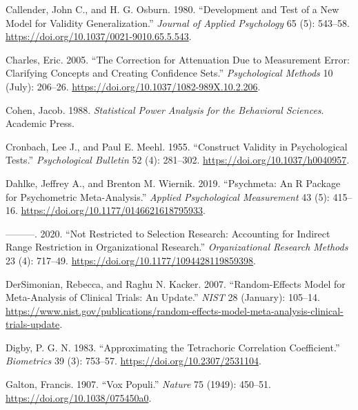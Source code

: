 \documentclass[
  letterpaper,
  DIV=11,
  numbers=noendperiod]{scrreprt}
\newlength{\cslhangindent}
\newlength{\cslentryspacingunit} %
\newenvironment{CSLReferences}[2] %
 {%
  \setlength{\parindent}{0pt}
  \ifodd #1
  \let\oldpar\par
  \def\par{\hangindent=\cslhangindent\oldpar}
  \fi
  \setlength{\parskip}{#2\cslentryspacingunit}
 }%
 {}
\begin{document}
\begin{CSLReferences}{1}{0}
\leavevmode{}%
Callender, John C., and H. G. Osburn. 1980. {``Development and Test of a
New Model for Validity Generalization.''} \emph{Journal of Applied
Psychology} 65 (5): 543--58.
\url{https://doi.org/10.1037/0021-9010.65.5.543}.

\leavevmode{}%
Charles, Eric. 2005. {``The Correction for Attenuation Due to
Measurement Error: Clarifying Concepts and Creating Confidence Sets.''}
\emph{Psychological Methods} 10 (July): 206--26.
\url{https://doi.org/10.1037/1082-989X.10.2.206}.

\leavevmode{}%
Cohen, Jacob. 1988. \emph{Statistical Power Analysis for the Behavioral
Sciences}. Academic Press.

\leavevmode{}%
Cronbach, Lee J., and Paul E. Meehl. 1955. {``Construct Validity in
Psychological Tests.''} \emph{Psychological Bulletin} 52 (4): 281--302.
\url{https://doi.org/10.1037/h0040957}.

\leavevmode{}%
Dahlke, Jeffrey A., and Brenton M. Wiernik. 2019. {``Psychmeta: An R
Package for Psychometric Meta-Analysis.''} \emph{Applied Psychological
Measurement} 43 (5): 415--16.
\url{https://doi.org/10.1177/0146621618795933}.

\leavevmode{}%
---------. 2020. {``Not Restricted to Selection Research: Accounting for
Indirect Range Restriction in Organizational Research.''}
\emph{Organizational Research Methods} 23 (4): 717--49.
\url{https://doi.org/10.1177/1094428119859398}.

\leavevmode{}%
DerSimonian, Rebecca, and Raghu N. Kacker. 2007. {``Random-Effects Model
for Meta-Analysis of Clinical Trials: An Update.''} \emph{NIST} 28
(January): 105--14.
\url{https://www.nist.gov/publications/random-effects-model-meta-analysis-clinical-trials-update}.

\leavevmode{}%
Digby, P. G. N. 1983. {``Approximating the Tetrachoric Correlation
Coefficient.''} \emph{Biometrics} 39 (3): 753--57.
\url{https://doi.org/10.2307/2531104}.

\leavevmode{}%
Galton, Francis. 1907. {``Vox Populi.''} \emph{Nature} 75 (1949):
450--51. \url{https://doi.org/10.1038/075450a0}.


\end{CSLReferences}
\end{document}

